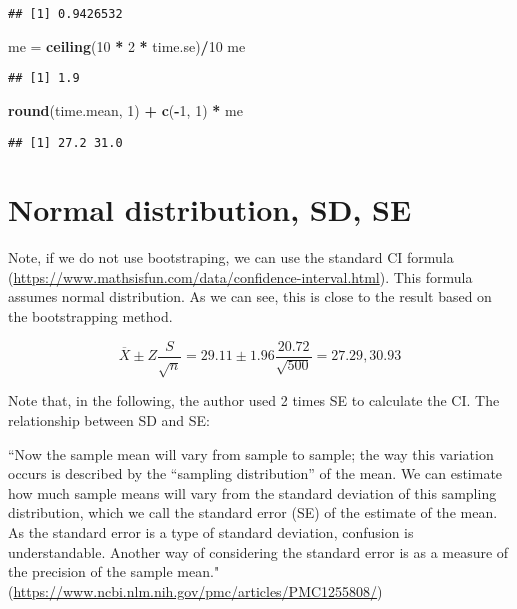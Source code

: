 \documentclass[]{book}
\newenvironment{Shaded}{\begin{snugshade}}{\end{snugshade}}
\newcommand{\DecValTok}[1]{\textcolor[rgb]{0.00,0.00,0.81}{#1}}
\newcommand{\KeywordTok}[1]{\textcolor[rgb]{0.13,0.29,0.53}{\textbf{#1}}}
\newcommand{\NormalTok}[1]{#1}
\newcommand{\OperatorTok}[1]{\textcolor[rgb]{0.81,0.36,0.00}{\textbf{#1}}}
\newcommand{\StringTok}[1]{\textcolor[rgb]{0.31,0.60,0.02}{#1}}
\begin{document}
\begin{verbatim}
## [1] 0.9426532
\end{verbatim}

\begin{Shaded}
\begin{Highlighting}[]
\NormalTok{me =}\StringTok{ }\KeywordTok{ceiling}\NormalTok{(}\DecValTok{10} \OperatorTok{*}\StringTok{ }\DecValTok{2} \OperatorTok{*}\StringTok{ }\NormalTok{time.se)}\OperatorTok{/}\DecValTok{10}
\NormalTok{me}
\end{Highlighting}
\end{Shaded}

\begin{verbatim}
## [1] 1.9
\end{verbatim}

\begin{Shaded}
\begin{Highlighting}[]
\KeywordTok{round}\NormalTok{(time.mean, }\DecValTok{1}\NormalTok{) }\OperatorTok{+}\StringTok{ }\KeywordTok{c}\NormalTok{(}\OperatorTok{-}\DecValTok{1}\NormalTok{, }\DecValTok{1}\NormalTok{) }\OperatorTok{*}\StringTok{ }\NormalTok{me}
\end{Highlighting}
\end{Shaded}

\begin{verbatim}
## [1] 27.2 31.0
\end{verbatim}

\hypertarget{normal-distribution-sd-se}{%
\section{Normal distribution, SD, SE}\label{normal-distribution-sd-se}}

Note, if we do not use bootstraping, we can use the standard CI formula (\url{https://www.mathsisfun.com/data/confidence-interval.html}). This formula assumes normal distribution. As we can see, this is close to the result based on the bootstrapping method.

\[\overline{X} \pm Z \frac{S}{\sqrt{n}}=29.11 \pm 1.96 \frac{20.72}{\sqrt{500}}=27.29, 30.93\]

Note that, in the following, the author used 2 times SE to calculate the CI. The relationship between SD and SE:

``Now the sample mean will vary from sample to sample; the way this variation occurs is described by the ``sampling distribution'' of the mean. We can estimate how much sample means will vary from the standard deviation of this sampling distribution, which we call the standard error (SE) of the estimate of the mean. As the standard error is a type of standard deviation, confusion is understandable. Another way of considering the standard error is as a measure of the precision of the sample mean." (\url{https://www.ncbi.nlm.nih.gov/pmc/articles/PMC1255808/})
\end{document}

